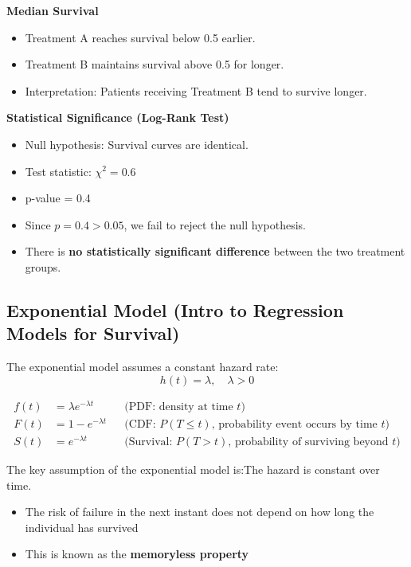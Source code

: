 \documentclass[10pt,a4paper]{article}
\begin{document}
\textbf{Median Survival}
\begin{itemize}
 \item Treatment A reaches survival below 0.5 earlier.
 \item Treatment B maintains survival above 0.5 for longer.
 \item Interpretation: Patients receiving Treatment B tend to survive longer.
\end{itemize}


\textbf{Statistical Significance (Log-Rank Test)}
\begin{itemize}
 \item Null hypothesis: Survival curves are identical.
 \item Test statistic: $\chi^2 = 0.6$
 \item p-value = 0.4
 \item Since $p = 0.4 > 0.05$, we fail to reject the null hypothesis.
 \item There is \textbf{no statistically significant difference} between the two treatment groups.
\end{itemize}




\subsection{Exponential Model (Intro to Regression Models for Survival)}

The exponential model assumes a constant hazard rate:
\[
h(t) = \lambda, \quad \lambda > 0
\]


 \begin{align*}
f(t) &= \lambda e^{-\lambda t} 
&& \text{(PDF: density at time } t\text{)} \\[6pt]
F(t) &= 1 - e^{-\lambda t} 
&& \text{(CDF: } P(T \le t)\text{, probability event occurs by time } t\text{)} \\[6pt]
S(t) &= e^{-\lambda t} 
&& \text{(Survival: } P(T > t)\text{, probability of surviving beyond } t\text{)}
\end{align*}



The key assumption of the exponential model is:The hazard is constant over time.

\begin{itemize}
\item The risk of failure in the next instant does not depend on how long the individual has survived
\item This is known as the \textbf{memoryless property}
\end{itemize}
\end{document}
